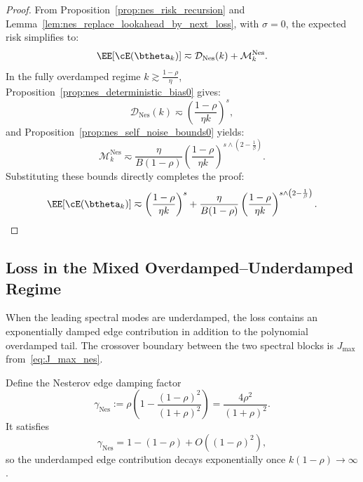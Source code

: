 \begin{proof}
From Proposition~\ref{prop:nes_risk_recursion} and Lemma~\ref{lem:nes_replace_lookahead_by_next_loss}, with \(\sigma=0\), the expected risk simplifies to:
\[
    \EE[\cE(\btheta_k)]
    \eqsim
    \mathcal{D}_{\mathrm{Nes}}(k)
    +
    \mathcal M_k^{\mathrm{Nes}}.
\]
In the fully overdamped regime \(k \gtrsim \frac{1-\rho}{\eta}\), Proposition~\ref{prop:nes_deterministic_bias0} gives:
\[
    \mathcal{D}_{\mathrm{Nes}}(k) \eqsim \left(\frac{1-\rho}{\eta k}\right)^s,
\]
and Proposition~\ref{prop:nes_self_noise_bounds0} yields:
\[
    \mathcal M_k^{\mathrm{Nes}}
    \eqsim
    \frac{\eta}{B(1-\rho)}
    \left(\frac{1-\rho}{\eta k}\right)^{s \wedge \left(2-\frac1\beta\right)}.
\]
Substituting these bounds directly completes the proof:
\[
    \EE[\cE(\btheta_k)]
    \eqsim
    \left(\frac{1-\rho}{\eta k}\right)^s
    +
    \frac{\eta}{B(1-\rho)}
    \left(\frac{1-\rho}{\eta k}\right)^{s \wedge \left(2-\frac1\beta\right)}.
\]
\end{proof}





\subsection{Loss in the Mixed Overdamped--Underdamped Regime}
\label{app:nes_mixed_loss}

When the leading spectral modes are underdamped, the loss contains an exponentially damped edge contribution in addition to the polynomial overdamped tail. The crossover boundary between the two spectral blocks is $J_{\max}$ from~\eqref{eq:J_max_nes}.


Define the Nesterov edge damping factor
\[
    \gamma_{\mathrm{Nes}}
    :=
    \rho\left(1-\frac{(1-\rho)^2}{(1+\rho)^2}\right)
    =
    \frac{4\rho^2}{(1+\rho)^2}.
\]
It satisfies
\[
    \gamma_{\mathrm{Nes}}=1-(1-\rho)+O((1-\rho)^2),
\]
so the underdamped edge contribution decays exponentially once $k(1-\rho)\to\infty$.

